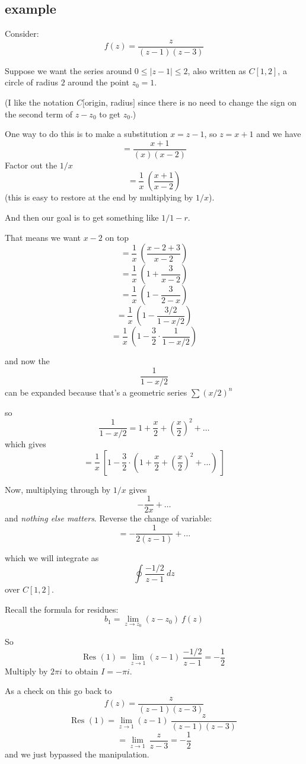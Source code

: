 \documentclass[11pt, oneside]{article}
\begin{document}
\subsection*{example}

Consider:
\[ f(z) = \frac{z}{(z-1)(z-3)} \]

Suppose we want the series around $0 \le | z - 1 | \le 2$, also written as $C[1,2]$, a circle of radius $2$ around the point $z_0 = 1$.

(I like the notation $C[$origin, radius$]$ since there is no need to change the sign on the second term of $z - z_0$ to get $z_0$.)

One way to do this is to make a substitution $x = z - 1$, so $z = x + 1$ and we have
\[  = \frac{x+1}{(x)(x-2)} \]
Factor out the $1/x$
\[ = \frac{1}{x} \ ( \frac{x+1}{x-2} ) \]
(this is easy to restore at the end by multiplying by $1/x$).

And then our goal is to get something like $1/1-r$.  

That means we want $x - 2$ on top
\[ = \frac{1}{x} \ ( \frac{x - 2 +  3}{x - 2} ) \]
\[ = \frac{1}{x} \ ( 1 + \frac{ 3}{x-2} ) \]
\[ = \frac{1}{x} \ ( 1 - \frac{ 3}{2-x} ) \]
\[ = \frac{1}{x} \ ( 1 - \frac{ 3/2}{1 - x/2} ) \]
\[ = \frac{1}{x} \ ( 1 - \frac{3}{2} \cdot \frac{1}{1 - x/2} ) \]

and now the 
\[ \frac{1}{1 - x/2} \]
can be expanded because that's a geometric series $\sum (x/2)^n$

so 
\[ \frac{1}{1 - x/2} = 1 + \frac{x}{2} + (\frac{x}{2} )^2 + \dots \]
which gives
\[ = \frac{1}{x} \ [ 1 - \frac{3}{2} \cdot (1 + \frac{x}{2} + (\frac{x}{2} )^2 + \dots) \ ] \]

Now, multiplying through by $1/x$ gives
\[ -\frac{1}{2x} + \dots \]
and \emph{nothing else matters}.  Reverse the change of variable:
\[ = -\frac{1}{2(z-1)} + \dots \]

which we will integrate as
\[ \oint \frac{-1/2}{z-1} \ dz \]
 over $C[1,2]$.
 
Recall the formula for residues:
\[ b_1 = \lim_{z \rightarrow z_0} (z-z_0) \ f(z)  \]

So
\[ \text{Res }(1) = \lim_{z \rightarrow 1} (z-1) \ \frac{-1/2}{z-1} = -\frac{1}{2} \]
Multiply by $2 \pi i$ to obtain $I = -\pi i$.

As a check on this go back to 
\[ f(z) = \frac{z}{(z-1)(z-3)} \]
\[ \text{Res }(1) = \lim_{z \rightarrow 1} (z-1) \ \frac{z}{(z-1)(z-3)} \]
\[ =  \lim_{z \rightarrow 1} \ \frac{z}{z-3}  = -\frac{1}{2} \]
and we just bypassed the manipulation.
\end{document}
